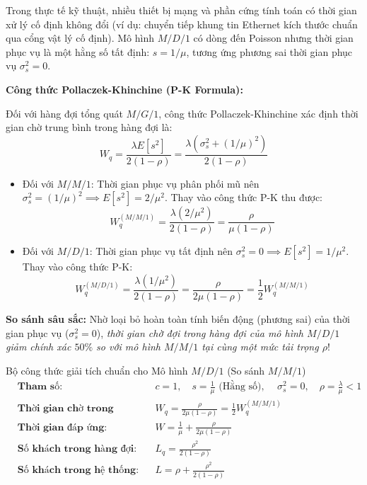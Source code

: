 \hspace{0.5cm}Trong thực tế kỹ thuật, nhiều thiết bị mạng và phần cứng tính toán có thời gian xử lý cố định không đổi (ví dụ: chuyển tiếp khung tin Ethernet kích thước chuẩn qua cổng vật lý cố định). Mô hình $M/D/1$ có dòng đến Poisson nhưng thời gian phục vụ là một hằng số tất định: $s = 1/\mu$, tương ứng phương sai thời gian phục vụ $\sigma_s^2 = 0$.

\textbf{Công thức Pollaczek-Khinchine (P-K Formula):}

Đối với hàng đợi tổng quát $M/G/1$, công thức Pollaczek-Khinchine xác định thời gian chờ trung bình trong hàng đợi là:
\begin{equation}
    W_q = \frac{\lambda E[s^2]}{2(1 - \rho)} = \frac{\lambda (\sigma_s^2 + (1/\mu)^2)}{2(1 - \rho)}
\end{equation}

\begin{itemize}[leftmargin=1.5em]
    \item Đối với $M/M/1$: Thời gian phục vụ phân phối mũ nên $\sigma_s^2 = (1/\mu)^2 \implies E[s^2] = 2/\mu^2$. Thay vào công thức P-K thu được:
    \begin{equation}
        W_q^{(M/M/1)} = \frac{\lambda (2/\mu^2)}{2(1 - \rho)} = \frac{\rho}{\mu(1 - \rho)}
    \end{equation}

    \item Đối với $M/D/1$: Thời gian phục vụ tất định nên $\sigma_s^2 = 0 \implies E[s^2] = 1/\mu^2$. Thay vào công thức P-K:
    \begin{equation}
        W_q^{(M/D/1)} = \frac{\lambda (1/\mu^2)}{2(1 - \rho)} = \frac{\rho}{2\mu(1 - \rho)} = \frac{1}{2} W_q^{(M/M/1)}
    \end{equation}
\end{itemize}

\textbf{So sánh sâu sắc:} Nhờ loại bỏ hoàn toàn tính biến động (phương sai) của thời gian phục vụ ($\sigma_s^2 = 0$), \textit{thời gian chờ đợi trong hàng đợi của mô hình $M/D/1$ giảm chính xác $50\%$ so với mô hình $M/M/1$ tại cùng một mức tải trọng $\rho$}!

\begin{modelbox}{Bộ công thức giải tích chuẩn cho Mô hình $M/D/1$ (So sánh $M/M/1$)}
\begin{align*}
    &\textbf{Tham số:} && c = 1, \quad s = \frac{1}{\mu} \text{ (Hằng số), } \quad \sigma_s^2 = 0, \quad \rho = \frac{\lambda}{\mu} < 1 \\[4pt]
    &\textbf{Thời gian chờ trong hàng đợi:} && W_q = \frac{\rho}{2\mu(1 - \rho)} = \frac{1}{2} W_q^{(M/M/1)} \\[4pt]
    &\textbf{Thời gian đáp ứng:} && W = \frac{1}{\mu} + \frac{\rho}{2\mu(1 - \rho)} \\[4pt]
    &\textbf{Số khách trong hàng đợi:} && L_q = \frac{\rho^2}{2(1 - \rho)} \\[4pt]
    &\textbf{Số khách trong hệ thống:} && L = \rho + \frac{\rho^2}{2(1 - \rho)}
\end{align*}
\end{modelbox}

